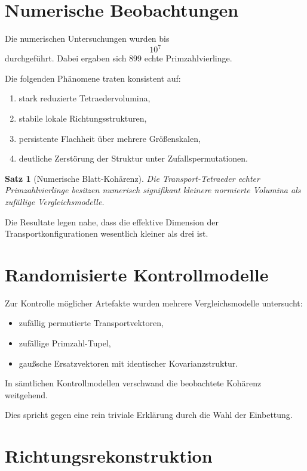 \documentclass[11pt,a4paper]{article}
\newtheorem{satz}{Satz}
\begin{document}
	\section{Numerische Beobachtungen}
	
	Die numerischen Untersuchungen wurden bis
	\[
	10^7
	\]
	durchgeführt. Dabei ergaben sich 899 echte Primzahlvierlinge.
	
	Die folgenden Phänomene traten konsistent auf:
	
	\begin{enumerate}[label=(\roman*)]
		\item stark reduzierte Tetraedervolumina,
		\item stabile lokale Richtungsstrukturen,
		\item persistente Flachheit über mehrere Größenskalen,
		\item deutliche Zerstörung der Struktur unter Zufallspermutationen.
	\end{enumerate}
	
	\begin{satz}[Numerische Blatt-Kohärenz]
		Die Transport-Tetraeder echter Primzahlvierlinge besitzen numerisch signifikant kleinere normierte Volumina als zufällige Vergleichsmodelle.
	\end{satz}
	
	Die Resultate legen nahe, dass die effektive Dimension der Transportkonfigurationen wesentlich kleiner als drei ist.
	
	\section{Randomisierte Kontrollmodelle}
	
	Zur Kontrolle möglicher Artefakte wurden mehrere Vergleichsmodelle untersucht:
	
	\begin{itemize}
		\item zufällig permutierte Transportvektoren,
		\item zufällige Primzahl-Tupel,
		\item gaußsche Ersatzvektoren mit identischer Kovarianzstruktur.
	\end{itemize}
	
	In sämtlichen Kontrollmodellen verschwand die beobachtete Kohärenz weitgehend.
	
	Dies spricht gegen eine rein triviale Erklärung durch die Wahl der Einbettung.
	
	\section{Richtungsrekonstruktion}
	
\end{document}
